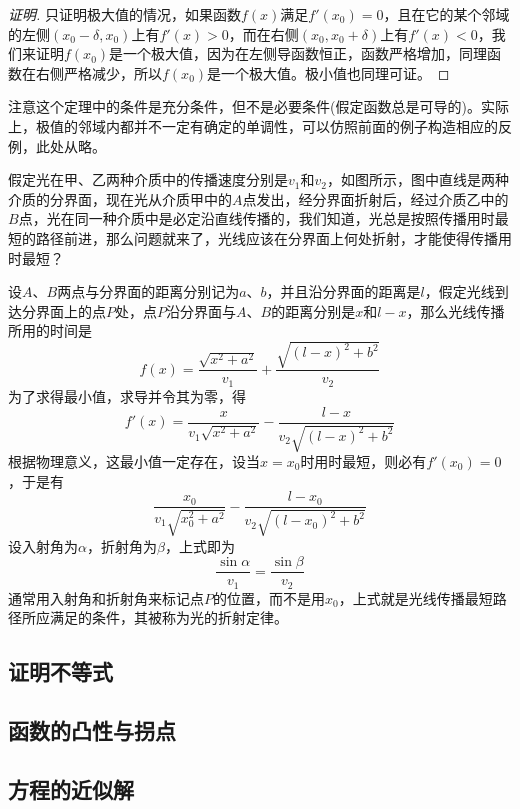 \begin{proof}[证明]
 只证明极大值的情况，如果函数$f(x)$满足$f'(x_0)=0$，且在它的某个邻域的左侧$(x_0-\delta,x_0)$上有$f'(x)>0$，而在右侧$(x_0,x_0+\delta)$上有$f'(x)<0$，我们来证明$f(x_0)$是一个极大值，因为在左侧导函数恒正，函数严格增加，同理函数在右侧严格减少，所以$f(x_0)$是一个极大值。极小值也同理可证。
\end{proof}

\begin{example}
  注意这个定理中的条件是充分条件，但不是必要条件(假定函数总是可导的)。实际上，极值的邻域内都并不一定有确定的单调性，可以仿照前面的例子构造相应的反例，此处从略。
\end{example}

\begin{example}[光的折射定律]
  假定光在甲、乙两种介质中的传播速度分别是$v_1$和$v_2$，如图所示，图中直线是两种介质的分界面，现在光从介质甲中的$A$点发出，经分界面折射后，经过介质乙中的$B$点，光在同一种介质中是必定沿直线传播的，我们知道，光总是按照传播用时最短的路径前进，那么问题就来了，光线应该在分界面上何处折射，才能使得传播用时最短？

  设$A$、$B$两点与分界面的距离分别记为$a$、$b$，并且沿分界面的距离是$l$，假定光线到达分界面上的点$P$处，点$P$沿分界面与$A$、$B$的距离分别是$x$和$l-x$，那么光线传播所用的时间是
  \[ f(x) = \frac{\sqrt{x^2+a^2}}{v_1}+\frac{\sqrt{(l-x)^2+b^2}}{v_2} \]
  为了求得最小值，求导并令其为零，得
  \[ f'(x) = \frac{x}{v_1\sqrt{x^2+a^2}} - \frac{l-x}{v_2 \sqrt{(l-x)^2+b^2}} \]
  根据物理意义，这最小值一定存在，设当$x=x_0$时用时最短，则必有$f'(x_0)=0$，于是有
  \[ \frac{x_0}{v_1\sqrt{x_0^2+a^2}} - \frac{l-x_0}{v_2 \sqrt{(l-x_0)^2+b^2}}\]
  设入射角为$\alpha$，折射角为$\beta$，上式即为
  \[ \frac{\sin{\alpha}}{v_1} = \frac{\sin{\beta}}{v_2} \]
  通常用入射角和折射角来标记点$P$的位置，而不是用$x_0$，上式就是光线传播最短路径所应满足的条件，其被称为光的折射定律。
\end{example}

\subsection{证明不等式}
\label{sec:proof-inequality-use-derivative}

\subsection{函数的凸性与拐点}
\label{sec:convert-of-function}

\subsection{方程的近似解}
\label{sec:approx-solve-of-equation}





